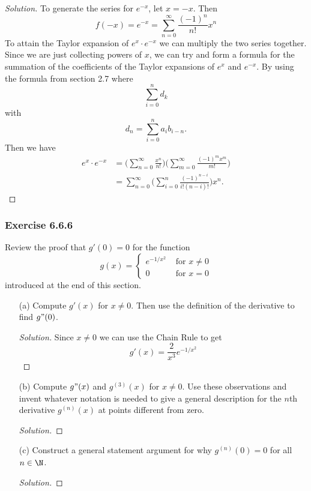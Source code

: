 \begin{enumerate}
        \begin{proof}[Solution]
        To generate the series for \( e^{-x} \), let \( x = -x  \). Then 
        \[  f(-x) = e^{-x} = \sum_{ n=0  }^{ \infty  } \frac{ (-1)^{n}  }{ n! } x^{n} \]
        To attain the Taylor expansion of \( e^{x} \cdot e^{-x } \) we can multiply the two series together. Since we are just collecting powers of \( x  \), we can try and form a formula for the summation of the coefficients of the Taylor expansions of \( e^{x} \) and \( e^{-x } \). By using the formula from section 2.7 where 
        \[  \sum_{ i=0 }^{ n } d_k \]
        with 
        \[  d_n = \sum_{ i=0 }^{ n } a_{i} b_{i -n}. \]
        Then we have 
        \begin{align*}
            e^{x} \cdot e^{-x} &=  \Big( \sum_{ n=0 }^{ \infty  } \frac{ x^{n} }{ n! }  \Big) \Big( \sum_{ m=0 }^{ \infty  } \frac{ (-1)^{m} x^{m} }{ m! }  \Big)  \\
                               &= \sum_{ n=0 }^{ \infty  } \Big( \sum_{ i=0 }^{ n } \frac{ (-1)^{n-i } }{ i! (n-i)! }  \Big) x^n.
        \end{align*}
        \end{proof}
\end{enumerate}

\subsubsection{Exercise 6.6.6} Review the proof that \( g'(0) = 0 \) for the function 
\[  g(x) = 
\begin{cases}
     e^{-1/x^2} &\text{ for } x \neq 0 \\
    0 &\text{ for } x = 0
\end{cases} \]
introduced at the end of this section.
\begin{enumerate}
    \item[(a)] Compute \( g'(x)  \) for \( x \neq 0  \). Then use the definition of the derivative to find \( g"(0) \).
        \begin{proof}[Solution]
        Since \( x \neq 0  \) we can use the Chain Rule to get 
        \[  g'(x) = \frac{ 2 }{ x^3  } e^{-1/x^2 } \]
        \end{proof}
    \item[(b)] Compute \( g"(x)  \) and \( g^{(3)}(x)  \) for \( x \neq 0  \). Use these observations and invent whatever notation is needed to give a general description for the \( n \)th derivative \( g^{(n)}(x)  \) at points different from zero.
        \begin{proof}[Solution]
        
        \end{proof}
    \item[(c)] Construct a general statement argument for why \( g^{(n)}(0) = 0  \) for all \( n \in \N  \).
        \begin{proof}[Solution]
        
        \end{proof}
\end{enumerate}





